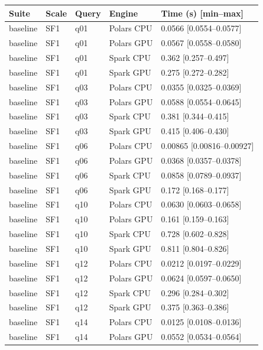 \begin{longtable}{lllll}
\toprule
Suite & Scale & Query & Engine & Time (s) [min--max] \\
\midrule
\endhead
\bottomrule
\endfoot
baseline & SF1 & q01 & Polars CPU & 0.0566 [0.0554--0.0577] \\
baseline & SF1 & q01 & Polars GPU & 0.0567 [0.0558--0.0580] \\
baseline & SF1 & q01 & Spark CPU & 0.362 [0.257--0.497] \\
baseline & SF1 & q01 & Spark GPU & 0.275 [0.272--0.282] \\
baseline & SF1 & q03 & Polars CPU & 0.0355 [0.0325--0.0369] \\
baseline & SF1 & q03 & Polars GPU & 0.0588 [0.0554--0.0645] \\
baseline & SF1 & q03 & Spark CPU & 0.381 [0.344--0.415] \\
baseline & SF1 & q03 & Spark GPU & 0.415 [0.406--0.430] \\
baseline & SF1 & q06 & Polars CPU & 0.00865 [0.00816--0.00927] \\
baseline & SF1 & q06 & Polars GPU & 0.0368 [0.0357--0.0378] \\
baseline & SF1 & q06 & Spark CPU & 0.0858 [0.0789--0.0937] \\
baseline & SF1 & q06 & Spark GPU & 0.172 [0.168--0.177] \\
baseline & SF1 & q10 & Polars CPU & 0.0630 [0.0603--0.0658] \\
baseline & SF1 & q10 & Polars GPU & 0.161 [0.159--0.163] \\
baseline & SF1 & q10 & Spark CPU & 0.728 [0.602--0.828] \\
baseline & SF1 & q10 & Spark GPU & 0.811 [0.804--0.826] \\
baseline & SF1 & q12 & Polars CPU & 0.0212 [0.0197--0.0229] \\
baseline & SF1 & q12 & Polars GPU & 0.0624 [0.0597--0.0650] \\
baseline & SF1 & q12 & Spark CPU & 0.296 [0.284--0.302] \\
baseline & SF1 & q12 & Spark GPU & 0.375 [0.363--0.386] \\
baseline & SF1 & q14 & Polars CPU & 0.0125 [0.0108--0.0136] \\
baseline & SF1 & q14 & Polars GPU & 0.0552 [0.0534--0.0564] \\

\end{longtable}
